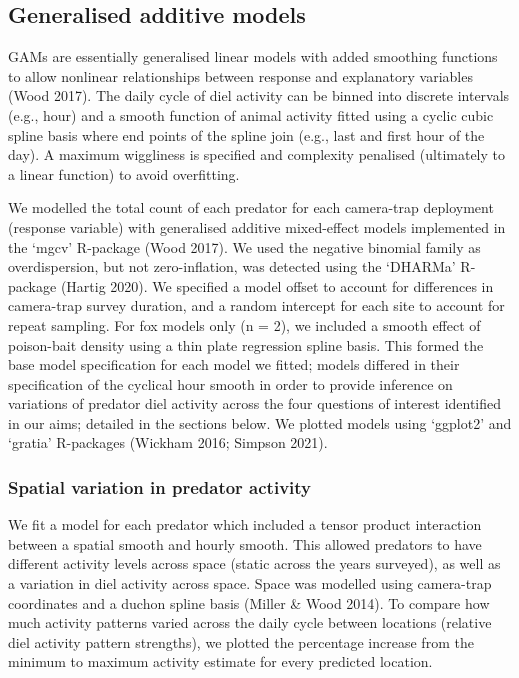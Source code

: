 \documentclass[11pt,a4paper,titlepage,twoside,openright]{style/unimelbthesis}
\begin{document}
\begin{mainmatter}
\hypertarget{generalised-additive-models}{%
\subsection{Generalised additive models}\label{generalised-additive-models}}

GAMs are essentially generalised linear models with added smoothing functions to allow nonlinear relationships between response and explanatory variables (Wood 2017). The daily cycle of diel activity can be binned into discrete intervals (e.g., hour) and a smooth function of animal activity fitted using a cyclic cubic spline basis where end points of the spline join (e.g., last and first hour of the day). A maximum wiggliness is specified and complexity penalised (ultimately to a linear function) to avoid overfitting.

We modelled the total count of each predator for each camera-trap deployment (response variable) with generalised additive mixed-effect models implemented in the `mgcv' R-package (Wood 2017). We used the negative binomial family as overdispersion, but not zero-inflation, was detected using the `DHARMa' R-package (Hartig 2020). We specified a model offset to account for differences in camera-trap survey duration, and a random intercept for each site to account for repeat sampling. For fox models only (n = 2), we included a smooth effect of poison-bait density using a thin plate regression spline basis. This formed the base model specification for each model we fitted; models differed in their specification of the cyclical hour smooth in order to provide inference on variations of predator diel activity across the four questions of interest identified in our aims; detailed in the sections below. We plotted models using `ggplot2' and `gratia' R-packages (Wickham 2016; Simpson 2021).

\hypertarget{spatial-variation-in-predator-activity}{%
\subsubsection{Spatial variation in predator activity}\label{spatial-variation-in-predator-activity}}

We fit a model for each predator which included a tensor product interaction between a spatial smooth and hourly smooth. This allowed predators to have different activity levels across space (static across the years surveyed), as well as a variation in diel activity across space. Space was modelled using camera-trap coordinates and a duchon spline basis (Miller \& Wood 2014). To compare how much activity patterns varied across the daily cycle between locations (relative diel activity pattern strengths), we plotted the percentage increase from the minimum to maximum activity estimate for every predicted location.


\end{mainmatter}
\end{document}
